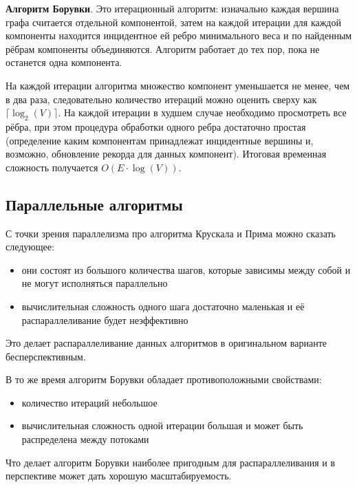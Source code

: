 \documentclass{article}
\begin{document}

\textbf{Алгоритм Борувки}.
Это итерационный алгоритм: изначально каждая вершина графа считается отдельной компонентой, затем на каждой итерации для каждой компоненты находится инцидентное ей ребро минимального веса и по найденным рёбрам компоненты объединяются. Алгоритм работает до тех пор, пока не останется одна компонента.

На каждой итерации алгоритма множество компонент уменьшается не менее, чем в два раза, следовательно количество итераций можно оценить сверху как $\lceil \log_2(V) \rceil$. На каждой итерации в худшем случае необходимо просмотреть все рёбра, при этом процедура обработки одного ребра достаточно простая (определение каким компонентам принадлежат инцидентные вершины и, возможно, обновление рекорда для данных компонент). Итоговая временная сложность получается $O(E \cdot \log(V))$.

\subsection{Параллельные алгоритмы}

С точки зрения параллелизма про алгоритма Крускала и Прима можно сказать следующее:
\begin{itemize}
	\item они состоят из большого количества шагов, которые зависимы между собой и не могут исполняться параллельно
	\item вычислительная сложность одного шага достаточно маленькая и её распараллеливание будет неэффективно
\end{itemize}
Это делает распараллеливание данных алгоритмов в оригинальном варианте бесперспективным.

В то же время алгоритм Борувки обладает противоположными свойствами:
\begin{itemize}
	\item количество итераций небольшое
	\item вычислительная сложность одной итерации большая и может быть распределена между потоками
\end{itemize}
Что делает алгоритм Борувки наиболее пригодным для распараллеливания и в перспективе может дать хорошую масштабируемость.
\end{document}
